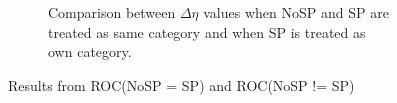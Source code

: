 \documentclass[11pt]{labbook}
\begin{document}
\begin{figure}
\begin{subfigure}{0.52\textwidth}
\caption{Comparison between $\Delta\eta$ values when NoSP and SP are treated as same category and when SP is treated as own category.}
\end{subfigure}
\caption{Results from ROC(NoSP = SP) and ROC(NoSP != SP)}
\end{figure}
\end{document}
